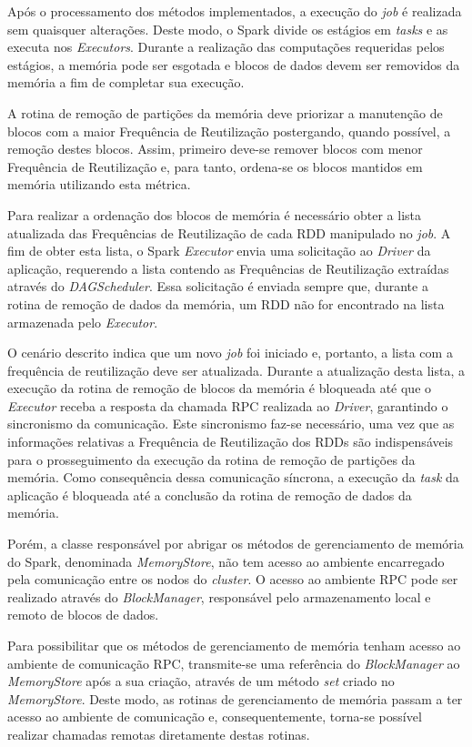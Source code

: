 Após o processamento dos métodos implementados, a execução do \textit{job} é realizada sem quaisquer alterações. Deste modo, o Spark divide os estágios em \textit{tasks} e as executa nos \textit{Executors}. Durante a realização das computações requeridas pelos estágios, a memória pode ser esgotada e blocos de dados devem ser removidos da memória a fim de completar sua execução. 

A rotina de remoção de partições da memória deve priorizar a manutenção de blocos com a maior Frequência de Reutilização postergando, quando possível, a remoção destes blocos. Assim, primeiro deve-se remover blocos com menor Frequência de Reutilização e, para tanto, ordena-se os blocos mantidos em memória utilizando esta métrica. 

Para realizar a ordenação dos blocos de memória é necessário obter a lista atualizada das Frequências de Reutilização de cada RDD manipulado no \textit{job}. A fim de obter esta lista, o Spark \textit{Executor} envia uma solicitação ao \textit{Driver} da aplicação, requerendo a lista contendo as Frequências de Reutilização extraídas através do \textit{DAGScheduler}. Essa solicitação é enviada sempre que, durante a rotina de remoção de dados da memória, um RDD não for encontrado na lista armazenada pelo \textit{Executor}.

O cenário descrito indica que um novo \textit{job} foi iniciado e, portanto, a lista com a frequência de reutilização deve ser atualizada. Durante a atualização desta lista, a execução da rotina de remoção de blocos da memória é bloqueada até que o \textit{Executor} receba a resposta da chamada RPC realizada ao \textit{Driver}, garantindo o sincronismo da comunicação. Este sincronismo faz-se necessário, uma vez que as informações relativas a Frequência de Reutilização dos RDDs são indispensáveis para o prosseguimento da execução da rotina de remoção de partições da memória. Como consequência dessa comunicação síncrona, a execução da \textit{task} da aplicação é bloqueada até a conclusão da rotina de remoção de dados da memória.

Porém, a classe responsável por abrigar os métodos de gerenciamento de memória do Spark, denominada \textit{MemoryStore}, não tem acesso ao ambiente encarregado pela comunicação entre os nodos do \textit{cluster}. O acesso ao ambiente RPC pode ser realizado através do \textit{BlockManager}, responsável pelo armazenamento local e remoto de blocos de dados. 

Para possibilitar que os métodos de gerenciamento de memória tenham acesso ao ambiente de comunicação RPC, transmite-se uma referência do \textit{BlockManager} ao \textit{MemoryStore} após a sua criação, através de um método \textit{set} criado no \textit{MemoryStore}. Deste modo, as rotinas de gerenciamento de memória passam a ter acesso ao ambiente de comunicação e, consequentemente, torna-se possível realizar chamadas remotas diretamente destas rotinas. 

